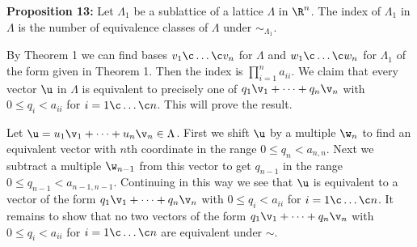 \textbf{Proposition 13:} Let $\Lambda_1$ be a sublattice of a lattice $\Lambda$ in $\R^n$.  The index of $\Lambda_1$ in $\Lambda$ is the number of equivalence classes of $\Lambda$ under $\sim_{\Lambda_1}$.

\pf By Theorem 1 we can find bases $v_1\c \dotsc\c v_n$ for $\Lambda$ and $w_1\c \dotsc\c w_n$ for $\Lambda_1$ of the form given in Theorem 1.  Then the index is $\prod_{i=1}^n a_{ii}$.  We claim that every vector $\u$ in $\Lambda$ is equivalent to precisely one of $q_1\v_1+\dotsb+q_n\v_n$ with $0\leq q_i<a_{ii}$ for $i=1\c \dotsc\c n$.  This will prove the result.

Let $\u=u_1\v_1+\dotsb+u_n\v_n\in\Lambda$.  First we shift $\u$ by a multiple $\w_n$ to find an equivalent vector with $n$th coordinate in the range $0\leq q_n<a_{n,n}$.  Next we subtract a multiple $\w_{n-1}$ from this vector to get $q_{n-1}$ in the range $0\leq q_{n-1}<a_{n-1,n-1}$.  Continuing in this way we see that $\u$ is equivalent to a vector of the form $q_1\v_1+\dotsb+q_n\v_n$ with $0\leq q_i<a_{ii}$ for $i=1\c \dotsc\c n$.  It remains to show that no two vectors of the form $q_1\v_1+\dotsb+q_n\v_n$ with $0\leq q_i<a_{ii}$ for $i=1\c \dotsc\c n$ are equivalent under $\sim$.
